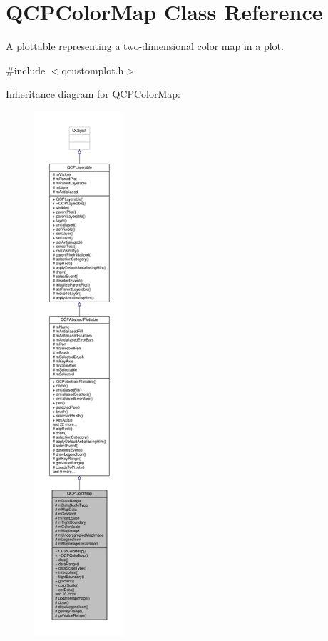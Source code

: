 \hypertarget{class_q_c_p_color_map}{}\section{Q\+C\+P\+Color\+Map Class Reference}
\label{class_q_c_p_color_map}


A plottable representing a two-\/dimensional color map in a plot.  




{\ttfamily \#include $<$qcustomplot.\+h$>$}



Inheritance diagram for Q\+C\+P\+Color\+Map\+:\nopagebreak
\begin{figure}[H]
\begin{center}
\leavevmode
\includegraphics[height=550pt]{class_q_c_p_color_map__inherit__graph}
\end{center}
\end{figure}


